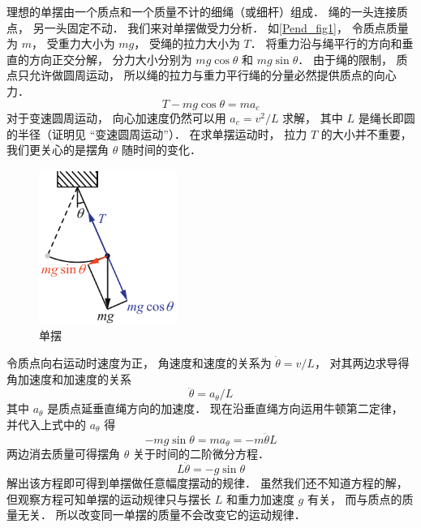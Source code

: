

理想的单摆由一个质点和一个质量不计的细绳（或细杆）组成． 绳的一头连接质点， 另一头固定不动． 我们来对单摆做受力分析． 如\autoref{Pend_fig1}， 令质点质量为 $m$， 受重力大小为 $mg$， 受绳的拉力大小为 $T$． 将重力沿与绳平行的方向和垂直的方向正交分解， 分力大小分别为 $mg\cos\theta$ 和 $mg\sin\theta$． 由于绳的限制， 质点只允许做圆周运动， 所以绳的拉力与重力平行绳的分量必然提供质点的向心力．
\begin{equation}
T - mg\cos\theta = ma_c
\end{equation}
对于变速圆周运动， 向心加速度仍然可以用 $a_c = v^2/L$ 求解， 其中 $L$ 是绳长即圆的半径（证明见 “变速圆周运动”）．%
在求单摆运动时， 拉力 $T$ 的大小并不重要， 我们更关心的是摆角 $\theta$ 随时间的变化．
\begin{figure}[ht]
\centering
\includegraphics[width=4.5cm]{./figures/Pend1.pdf}
\caption{单摆} \label{Pend_fig1}
\end{figure}

令质点向右运动时速度为正， 角速度和速度的关系为 $\dot\theta = v/L$， 对其两边求导得角加速度和加速度的关系
\begin{equation}
\ddot\theta = a_\theta/L
\end{equation}
其中 $a_\theta$ 是质点延垂直绳方向的加速度． 现在沿垂直绳方向运用牛顿第二定律， 并代入上式中的 $a_\theta$ 得
\begin{equation}
-mg\sin\theta = ma_\theta = -m\ddot\theta L
\end{equation}
两边消去质量可得摆角 $\theta$ 关于时间的二阶微分方程．
\begin{equation}\label{Pend_eq4}
L\ddot\theta = - g\sin\theta
\end{equation}
解出该方程即可得到单摆做任意幅度摆动的规律． 虽然我们还不知道方程的解， 但观察方程可知单摆的运动规律只与摆长 $L$ 和重力加速度 $g$ 有关， 而与质点的质量无关． 所以改变同一单摆的质量不会改变它的运动规律．

